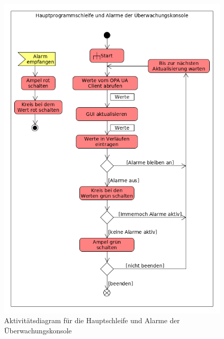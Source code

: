 \documentclass[parskip=full]{scrartcl}
\begin{document}
\begin{figure}[h!]
  \centering
  \includegraphics[scale=0.62]{media/Activities/main-console.png}
  \caption{Aktivitätsdiagram für die Hauptschleife und Alarme der Überwachungskonsole}
\end{figure}
\end{document}
